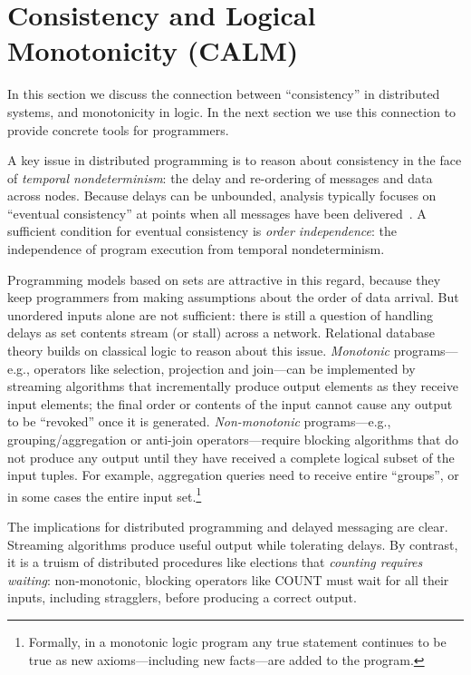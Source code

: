 \section{Consistency and Logical Monotonicity (CALM)}
In this section we discuss the connection between ``consistency'' in distributed systems, and monotonicity in logic.  In the next section we use this connection to provide concrete tools for programmers.

A key issue in distributed programming is to reason about consistency in the face of {\em
temporal nondeterminism}: the delay and re-ordering of messages and data across
nodes.  Because delays can be unbounded, analysis typically focuses on ``eventual consistency'' at points when all messages have been delivered~\cite{vogels}.  A sufficient condition for eventual consistency is {\em order independence}: the independence of program execution from temporal
nondeterminism.

Programming models based on sets are attractive in this regard, because they keep programmers from making assumptions about the order of data arrival.  But unordered inputs alone are not sufficient: there is still a question of handling delays as set contents stream (or stall) across a network. Relational database theory builds on classical logic to reason about this issue. \emph{Monotonic} programs---e.g., operators like selection, projection and join---can be implemented by streaming algorithms that incrementally produce output elements as they receive input elements; the final order or contents of the input cannot cause any output to be ``revoked'' once it is generated.  
\emph{Non-monotonic} programs---e.g., grouping/aggregation or anti-join operators---require blocking algorithms that do not produce any output until they have received a complete logical subset of the input tuples.  For example, aggregation queries need to receive entire ``groups'', or in some cases the entire input set.\footnote{Formally, in a monotonic logic program any true statement continues to be true as new axioms---including new facts---are added to the program.}  

The implications for distributed programming and delayed messaging are clear. Streaming algorithms produce useful output while tolerating delays.  By contrast, it is a truism of distributed procedures like elections that \emph{counting requires waiting}: non-monotonic, blocking operators like COUNT must wait for all their inputs, including stragglers, before producing a correct output.

